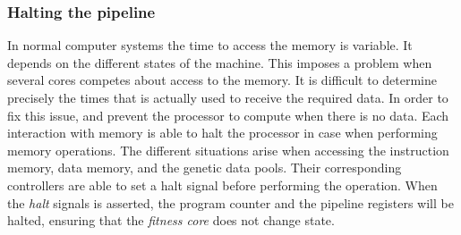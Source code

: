 

\subsubsection{Halting the pipeline}
In normal computer systems the time to access the memory is variable. It depends on the different states of the machine. This imposes a problem when several cores competes about access to the memory. It is difficult to determine precisely the times that is actually used to receive the required data. In order to fix this issue, and prevent the processor to compute when there is no data. Each interaction with memory is able to halt the processor in case when performing memory operations. The different situations arise when accessing the instruction memory, data memory, and the genetic data pools. Their corresponding controllers are able to set a halt signal before performing the operation. When the \emph{halt} signals is asserted, the program counter and the pipeline registers will be halted, ensuring that the \emph{fitness core} does not change state. 





